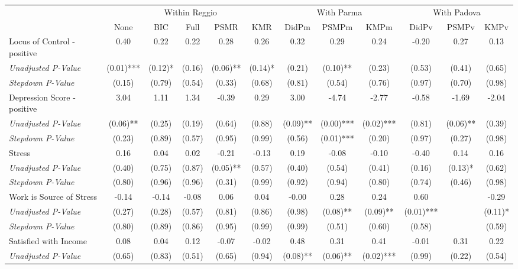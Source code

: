 \begin{tabular}{l c c c c c c c c c c c}
\toprule
& \multicolumn{5}{c}{Within Reggio} & \multicolumn{3}{c}{With Parma} & \multicolumn{3}{c}{With Padova} \\\cmidrule(lr){2-6} \cmidrule(lr){7-9} \cmidrule(lr){10-12}
 & None & BIC & Full & PSMR & KMR & DidPm & PSMPm & KMPm & DidPv & PSMPv & KMPv \\
\midrule
Locus of Control - positive & 0.40 & 0.22 & 0.22 & 0.28 & 0.26 & 0.32 & 0.29 & 0.24 & -0.20 & 0.27 & 0.13 \\
\quad \textit{Unadjusted P-Value} & (0.01)*** & (0.12)* & (0.16) & (0.06)** & (0.14)* & (0.21) & (0.10)** & (0.23) & (0.53) & (0.41) & (0.65) \\
\quad \textit{Stepdown P-Value} & (0.15) & (0.79) & (0.54) & (0.33) & (0.68) & (0.81) & (0.54) & (0.76) & (0.97) & (0.70) & (0.98) \\
Depression Score - positive & 3.04 & 1.11 & 1.34 & -0.39 & 0.29 & 3.00 & -4.74 & -2.77 & -0.58 & -1.69 & -2.04 \\
\quad \textit{Unadjusted P-Value} & (0.06)** & (0.25) & (0.19) & (0.64) & (0.88) & (0.09)** & (0.00)*** & (0.02)*** & (0.81) & (0.06)** & (0.39) \\
\quad \textit{Stepdown P-Value} & (0.23) & (0.89) & (0.57) & (0.95) & (0.99) & (0.56) & (0.01)*** & (0.20) & (0.97) & (0.27) & (0.98) \\
Stress & 0.16 & 0.04 & 0.02 & -0.21 & -0.13 & 0.19 & -0.08 & -0.10 & -0.40 & 0.14 & 0.16 \\
\quad \textit{Unadjusted P-Value} & (0.40) & (0.75) & (0.87) & (0.05)** & (0.57) & (0.40) & (0.54) & (0.41) & (0.16) & (0.13)* & (0.62) \\
\quad \textit{Stepdown P-Value} & (0.80) & (0.96) & (0.96) & (0.31) & (0.99) & (0.92) & (0.94) & (0.80) & (0.74) & (0.46) & (0.98) \\
Work is Source of Stress & -0.14 & -0.14 & -0.08 & 0.06 & 0.04 & -0.00 & 0.28 & 0.24 & 0.60 & & -0.29 \\
\quad \textit{Unadjusted P-Value} & (0.27) & (0.28) & (0.57) & (0.81) & (0.86) & (0.98) & (0.08)** & (0.09)** & (0.01)*** & & (0.11)* \\
\quad \textit{Stepdown P-Value} & (0.80) & (0.89) & (0.86) & (0.95) & (0.99) & (0.99) & (0.51) & (0.60) & (0.58) & & (0.59) \\
Satisfied with Income & 0.08 & 0.04 & 0.12 & -0.07 & -0.02 & 0.48 & 0.31 & 0.41 & -0.01 & 0.31 & 0.22 \\
\quad \textit{Unadjusted P-Value} & (0.65) & (0.83) & (0.51) & (0.65) & (0.94) & (0.08)** & (0.06)** & (0.02)*** & (0.99) & (0.22) & (0.54) \\

\end{tabular}

